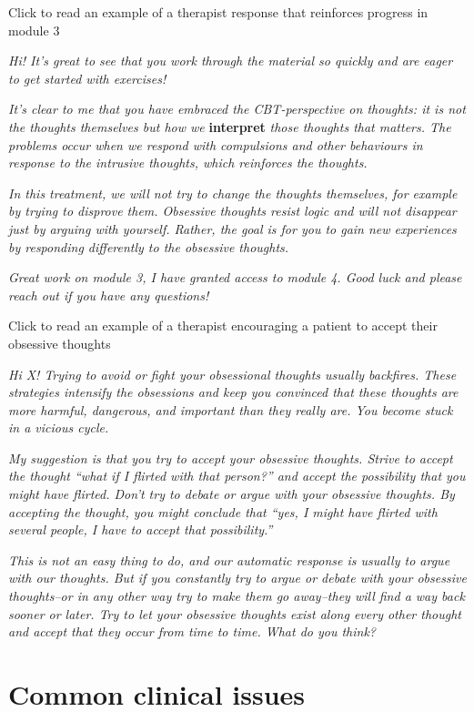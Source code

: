 \documentclass[]{book}
\begin{document}
Click to read an example of a therapist response that reinforces progress in module 3

\emph{Hi! It's great to see that you work through the material so quickly and are eager to get started with exercises!}

\emph{It's clear to me that you have embraced the CBT-perspective on thoughts: it is not the thoughts themselves but how we} \textbf{interpret} \emph{those thoughts that matters. The problems occur when we respond with compulsions and other behaviours in response to the intrusive thoughts, which reinforces the thoughts.}

\emph{In this treatment, we will not try to change the thoughts themselves, for example by trying to disprove them. Obsessive thoughts resist logic and will not disappear just by arguing with yourself. Rather, the goal is for you to gain new experiences by responding differently to the obsessive thoughts.}

\emph{Great work on module 3, I have granted access to module 4. Good luck and please reach out if you have any questions!}

Click to read an example of a therapist encouraging a patient to accept their obsessive thoughts

\emph{Hi X! Trying to avoid or fight your obsessional thoughts usually backfires. These strategies intensify the obsessions and keep you convinced that these thoughts are more harmful, dangerous, and important than they really are. You become stuck in a vicious cycle.}

\emph{My suggestion is that you try to accept your obsessive thoughts. Strive to accept the thought ``what if I flirted with that person?'' and accept the possibility that you might have flirted. Don't try to debate or argue with your obsessive thoughts. By accepting the thought, you might conclude that ``yes, I might have flirted with several people, I have to accept that possibility.''}

\emph{This is not an easy thing to do, and our automatic response is usually to argue with our thoughts. But if you constantly try to argue or debate with your obsessive thoughts--or in any other way try to make them go away--they will find a way back sooner or later. Try to let your obsessive thoughts exist along every other thought and accept that they occur from time to time. What do you think?}

\hypertarget{common-clinical-issues}{%
\section{Common clinical issues}\label{common-clinical-issues}}
\end{document}
